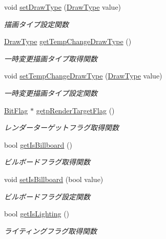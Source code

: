 \begin{DoxyCompactItemize}
void \mbox{\hyperlink{class_draw_order_list_a03d72a3943c45d19b70602ed7f526906}{set\+Draw\+Type}} (\mbox{\hyperlink{class_draw_order_list_a6c9b9ceb312c16d399ef355f4f3486bb}{Draw\+Type}} value)
\begin{DoxyCompactList}\small\item\em 描画タイプ設定関数 \end{DoxyCompactList}\item 
\mbox{\hyperlink{class_draw_order_list_a6c9b9ceb312c16d399ef355f4f3486bb}{Draw\+Type}} \mbox{\hyperlink{class_draw_order_list_a8ab03bec2bf394ed6ffc3d44b0eaabb4}{get\+Temp\+Change\+Draw\+Type}} ()
\begin{DoxyCompactList}\small\item\em 一時変更描画タイプ取得関数 \end{DoxyCompactList}\item 
void \mbox{\hyperlink{class_draw_order_list_a4e4126b1de6ba16ce30558b9e8d9b490}{set\+Temp\+Change\+Draw\+Type}} (\mbox{\hyperlink{class_draw_order_list_a6c9b9ceb312c16d399ef355f4f3486bb}{Draw\+Type}} value)
\begin{DoxyCompactList}\small\item\em 一時変更描画タイプ設定関数 \end{DoxyCompactList}\item 
\mbox{\hyperlink{class_bit_flag}{Bit\+Flag}} $\ast$ \mbox{\hyperlink{class_draw_order_list_a3c483376f2da73a403bbd82f7e9e3370}{getp\+Render\+Target\+Flag}} ()
\begin{DoxyCompactList}\small\item\em レンダーターゲットフラグ取得関数 \end{DoxyCompactList}\item 
bool \mbox{\hyperlink{class_draw_order_list_a5d49272331a0f6f8656839ba5fe5e1b6}{get\+Is\+Billboard}} ()
\begin{DoxyCompactList}\small\item\em ビルボードフラグ取得関数 \end{DoxyCompactList}\item 
void \mbox{\hyperlink{class_draw_order_list_a80a404e3308a92dcb9bfa3451518d14e}{set\+Is\+Billboard}} (bool value)
\begin{DoxyCompactList}\small\item\em ビルボードフラグ設定関数 \end{DoxyCompactList}\item 
bool \mbox{\hyperlink{class_draw_order_list_a1015463f08f8bf1118d5d1f79029d869}{get\+Is\+Lighting}} ()
\begin{DoxyCompactList}\small\item\em ライティングフラグ取得関数 \end{DoxyCompactList}\item 

\end{DoxyCompactItemize}
